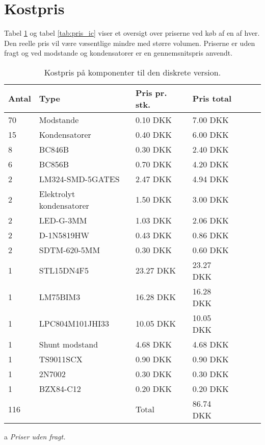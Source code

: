 \section{Kostpris} \label{sec:sammenligning_kostpris}

Tabel \ref{tab:pris_diskret} og tabel \ref{tab:pris_ic} viser et oversigt over priserne ved køb af en af hver. Den reelle pris vil være væsentlige mindre med større volumen. Priserne er uden fragt og ved modstande og kondensatorer er en gennemsnitspris anvendt.

\begin{table}[h!]
	\small
	\centering
	\begin{threeparttable}
		\begin{tabular}{ l l l l l l l }
			\toprule
			\multicolumn{1}{l}{\textbf{Antal}}          &
			\multicolumn{1}{l}{\textbf{Type}}           &
			\multicolumn{1}{l}{\textbf{Pris pr. stk.}}  &
			\multicolumn{1}{l}{\textbf{Pris total}}   \\ 
			\hline
			70 &  Modstande                 &  0.10 DKK   &  7.00 DKK  \\
			15 &  Kondensatorer             &  0.40 DKK   &  6.00 DKK  \\
		    8  &  BC846B                    &  0.30 DKK   &  2.40 DKK  \\
		    6  &  BC856B                    &  0.70 DKK   &  4.20 DKK  \\
		    2  &  LM324-SMD-5GATES          &  2.47 DKK   &  4.94 DKK  \\ 
			2  &  Elektrolyt kondensatorer  &  1.50 DKK   &  3.00 DKK  \\
			2  &  LED-G-3MM                 &  1.03 DKK   &  2.06 DKK  \\
	 	    2  &  D-1N5819HW                &  0.43 DKK   &  0.86 DKK  \\
	 	    2  &  SDTM-620-5MM              &  0.30 DKK   &  0.60 DKK  \\ 
		    1  &  STL15DN4F5                & 23.27 DKK   & 23.27 DKK  \\
		    1  &  LM75BIM3                  & 16.28 DKK   & 16.28 DKK  \\
		   	1  &  LPC804M101JHI33           & 10.05 DKK   & 10.05 DKK  \\
		   	1  &  Shunt modstand            &  4.68 DKK   &  4.68 DKK  \\
		   	1  &  TS9011SCX                 &  0.90 DKK   &  0.90 DKK  \\
  			1  &  2N7002                    &  0.30 DKK   &  0.30 DKK  \\
	  	    1  &  BZX84-C12                 &  0.20 DKK   &  0.20 DKK  \\
	        \hline
	  	   116 &                            & Total       & 86.74 DKK  \\  
			\hline
			\bottomrule
		\end{tabular}
		\begin{tablenotes}
		\item[a] \textit{Priser uden fragt.}
		\end{tablenotes}
		\caption{Kostpris på komponenter til den diskrete version.}
		\label{tab:pris_diskret}
	\end{threeparttable}
\end{table} 
